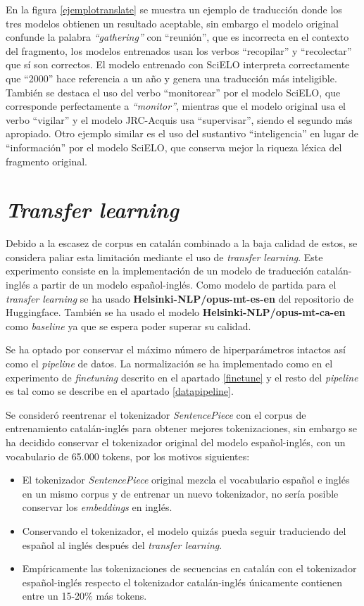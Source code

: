 En la figura \ref{ejemplotranslate} se muestra un ejemplo de traducción donde los tres modelos obtienen un resultado aceptable, sin embargo el modelo original confunde la palabra \textit{``gathering''} con ``reunión'', que es incorrecta en el contexto del fragmento, los modelos entrenados usan los verbos ``recopilar'' y ``recolectar'' que sí son correctos.
El modelo entrenado con SciELO interpreta correctamente que ``2000'' hace referencia a un año y genera una traducción más inteligible.
También se destaca el uso del verbo ``monitorear'' por el modelo SciELO, que corresponde perfectamente a \textit{``monitor''}, mientras que el modelo original usa el verbo ``vigilar'' y el modelo JRC-Acquis usa ``supervisar'', siendo el segundo más apropiado. Otro ejemplo similar es el uso del sustantivo ``inteligencia'' en lugar de ``información'' por el modelo SciELO, que conserva mejor la riqueza léxica del fragmento original.


\section{\textit{Transfer learning}}
Debido a la escasez de corpus en catalán combinado a la baja calidad de estos, se considera paliar esta limitación mediante el uso de \textit{transfer learning}.
Este experimento consiste en la implementación de un modelo de traducción catalán-inglés a partir de un modelo español-inglés.
Como modelo de partida para el \textit{transfer learning} se ha usado \textbf{Helsinki-NLP/opus-mt-es-en} del repositorio de Huggingface. También se ha usado el modelo \textbf{Helsinki-NLP/opus-mt-ca-en} como \textit{baseline} ya que se espera poder superar su calidad.

Se ha optado por conservar el máximo número de hiperparámetros intactos así como el \textit{pipeline} de datos. La normalización se ha implementado como en el experimento de \textit{finetuning} descrito en el apartado \ref{finetune} y el resto del \textit{pipeline} es tal como se describe en el apartado \ref{datapipeline}.

Se consideró reentrenar el tokenizador \textit{SentencePiece} con el corpus de entrenamiento catalán-inglés para obtener mejores tokenizaciones, sin embargo se ha decidido conservar el tokenizador original del modelo español-inglés, con un vocabulario de 65.000 tokens, por los motivos siguientes:
\begin{itemize}
    \item El tokenizador \textit{SentencePiece} original mezcla el vocabulario español e inglés en un mismo corpus y de entrenar un nuevo tokenizador, no sería posible conservar los \textit{embeddings} en inglés.
    \item Conservando el tokenizador, el modelo quizás pueda seguir traduciendo del español al inglés después del \textit{transfer learning}.
    \item Empíricamente las tokenizaciones de secuencias en catalán con el tokenizador español-inglés respecto el tokenizador catalán-inglés únicamente contienen entre un 15-20\% más tokens.
\end{itemize}

